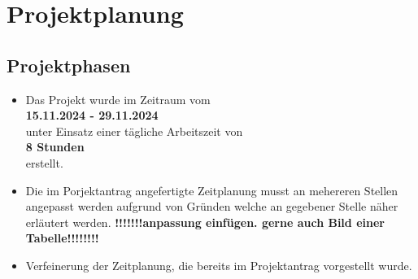 \section{Projektplanung} 
\label{sec:Projektplanung}


\subsection{Projektphasen}
\label{sec:Projektphasen}

\begin{itemize}
	\item Das Projekt wurde im Zeitraum vom\\
	\textbf{15.11.2024 - 29.11.2024}\\
	unter Einsatz einer tägliche Arbeitszeit von\\
	\textbf{8 Stunden}\\
	erstellt.
    \item Die im Porjektantrag angefertigte Zeitplanung musst an mehereren Stellen angepasst werden aufgrund von Gründen welche an 
	gegebener Stelle näher erläutert werden. 
	 \textbf{!!!!!!!anpassung einfügen. gerne auch Bild einer Tabelle!!!!!!!!}

	\item Verfeinerung der Zeitplanung, die bereits im Projektantrag vorgestellt wurde.
\end{itemize}



